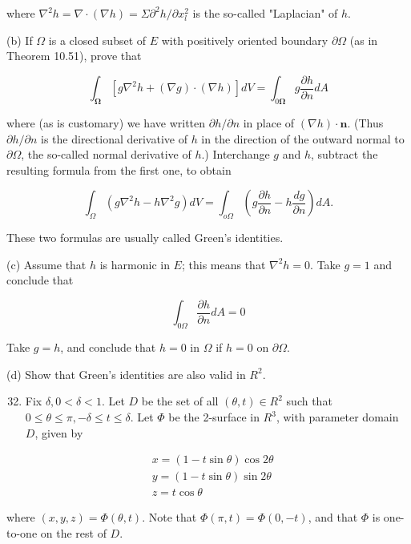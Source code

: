 \documentclass[10pt]{article}
\begin{document}
where $\nabla^{2} h=\nabla \cdot(\nabla h)=\Sigma \partial^{2} h / \partial x_{l}^{2}$ is the so-called "Laplacian" of $h$.

(b) If $\Omega$ is a closed subset of $E$ with positively oriented boundary $\partial \Omega$ (as in Theorem 10.51), prove that

$$
\int_{\mathbf{\Omega}}\left[g \nabla^{2} h+(\nabla g) \cdot(\nabla h)\right] d V=\int_{0 \mathbf{\Omega}} g \frac{\partial h}{\partial n} d A
$$

where (as is customary) we have written $\partial h / \partial n$ in place of $(\nabla h) \cdot \mathbf{n}$. (Thus $\partial h / \partial n$ is the directional derivative of $h$ in the direction of the outward normal to $\partial \Omega$, the so-called normal derivative of $h$.) Interchange $g$ and $h$, subtract the resulting formula from the first one, to obtain

$$
\int_{\Omega}\left(g \nabla^{2} h-h \nabla^{2} g\right) d V=\int_{o \Omega}\left(g \frac{\partial h}{\partial n}-h \frac{d g}{\partial n}\right) d A .
$$

These two formulas are usually called Green's identities.

(c) Assume that $h$ is harmonic in $E$; this means that $\nabla^{2} h=0$. Take $g=1$ and conclude that

$$
\int_{0 \Omega} \frac{\partial h}{\partial n} d A=0
$$

Take $g=h$, and conclude that $h=0$ in $\Omega$ if $h=0$ on $\partial \Omega$.

(d) Show that Green's identities are also valid in $R^{2}$.

\begin{enumerate}
  \setcounter{enumi}{31}
  \item Fix $\delta, 0<\delta<1$. Let $D$ be the set of all $(\theta, t) \in R^{2}$ such that $0 \leq \theta \leq \pi,-\delta \leq t \leq \delta$. Let $\Phi$ be the 2-surface in $R^{3}$, with parameter domain $D$, given by
\end{enumerate}

$$
\begin{aligned}
& x=(1-t \sin \theta) \cos 2 \theta \\
& y=(1-t \sin \theta) \sin 2 \theta \\
& z=t \cos \theta
\end{aligned}
$$

where $(x, y, z)=\Phi(\theta, t)$. Note that $\Phi(\pi, t)=\Phi(0,-t)$, and that $\Phi$ is one-to-one on the rest of $D$.
\end{document}
